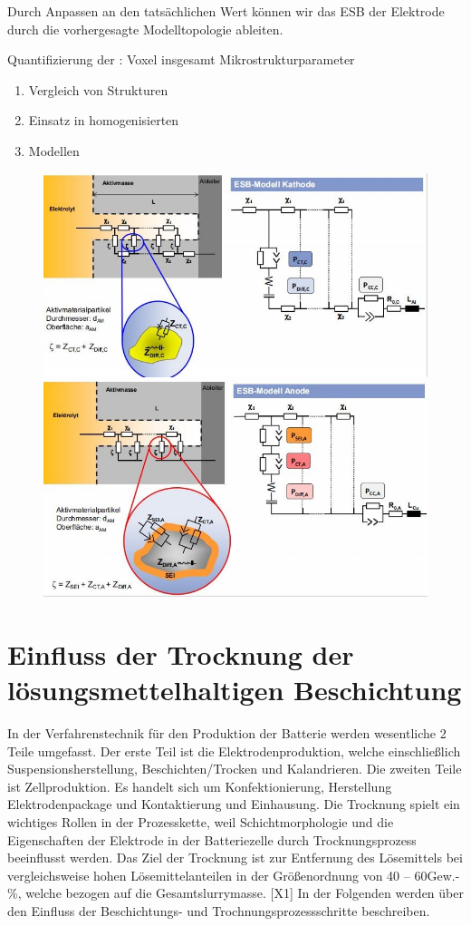 \documentclass[12pt,UTF8]{article}
\begin{document}
\newpage
Durch Anpassen an den tatsächlichen Wert können wir das ESB der Elektrode durch die vorhergesagte Modelltopologie ableiten.

Quantifizierung der : Voxel insgesamt Mikrostrukturparameter
\begin{enumerate}
    \item  Vergleich von Strukturen
    \item  Einsatz in homogenisierten
    \item  Modellen
\end{enumerate}

\begin{figure}[H]
    \centering

    \includegraphics[width=.5\linewidth]{Diagramme/fig3_1_10.jpg}
    \caption{}
    \includegraphics[width=.5\linewidth]{Diagramme/fig3_1_11.jpg}
    \caption{}
\end{figure}
\newpage

\section{Einfluss der Trocknung der l\"osungsmettelhaltigen Beschichtung}
In der Verfahrenstechnik für den Produktion der Batterie werden wesentliche 2 Teile umgefasst. Der erste Teil ist die Elektrodenproduktion, welche einschließlich Suspensionsherstellung, Beschichten/Trocken und Kalandrieren. Die zweiten Teile ist Zellproduktion. Es handelt sich um Konfektionierung, Herstellung Elektrodenpackage und Kontaktierung und Einhausung.
Die Trocknung spielt ein wichtiges Rollen in der Prozesskette, weil Schichtmorphologie und die Eigenschaften der Elektrode in der Batteriezelle durch Trocknungsprozess beeinflusst werden. Das Ziel der Trocknung ist zur Entfernung des Lösemittels bei vergleichsweise hohen Lösemittelanteilen in der Größenordnung von 40 – 60Gew.-\%, welche bezogen auf die Gesamtslurrymasse. [X1] In der Folgenden werden über den Einfluss der Beschichtungs- und Trochnungsprozessschritte beschreiben.
\end{document}
